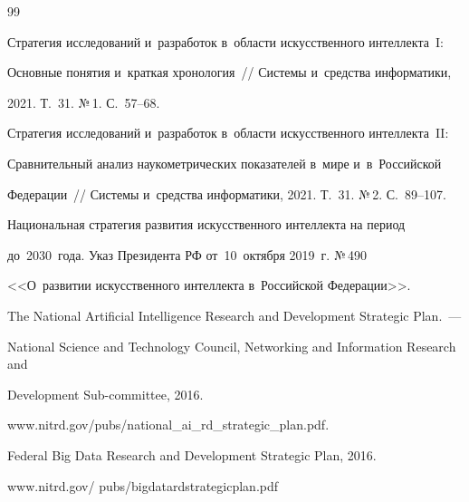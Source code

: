   {\small\frenchspacing


  {%




  \begin{thebibliography}{99}









Стратегия исследований и~разработок в~области искусственного интеллекта~I:


Основные понятия и~краткая хронология~/\!\!/ Системы и~средства информатики,


2021. Т.~31. №\,1. С.~57--68.






Стратегия исследований и~разработок в~области искусственного интеллекта~II:


Сравнительный анализ наукометрических показателей в~мире и~в~Российской


Федерации~/\!\!/ Сис\-те\-мы и~средства информатики, 2021. Т.~31. №\,2. С.~89--107.




Национальная стратегия развития искусственного интеллекта на период


до~2030~года. Указ Президента РФ от~10~октября 2019~г. №\,490


<<О~развитии искусственного интеллекта в~Российской Федерации>>.




The National Artificial Intelligence Research and Development Strategic Plan.~---


National Science and Technology Council, Networking and Information Research and


Development Sub-committee, 2016.


     {\sf www.nitrd.gov/pubs/national\_ai\_rd\_\linebreak strategic\_plan.pdf}.




Federal Big Data Research and Development Strategic Plan, 2016.


     {\sf www.nitrd.gov/ pubs/bigdatardstrategicplan.pdf}





\end{thebibliography}}}
